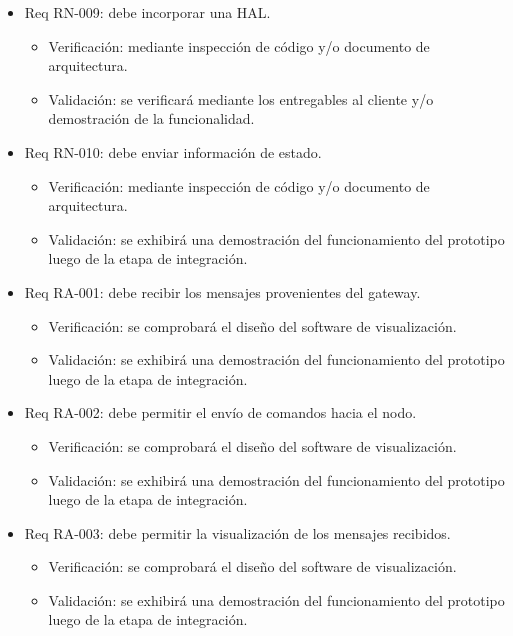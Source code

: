 \documentclass[11pt]{charter}
\begin{document}
\begin{itemize} 
\item Req RN-009: debe incorporar una HAL.
\begin{itemize}
\item Verificación: mediante inspección de código y/o documento de arquitectura.
\item Validación: se verificará mediante los entregables al cliente y/o demostración de la funcionalidad.  
\end{itemize}
\end{itemize}

\begin{itemize} 
\item Req RN-010: debe enviar información de estado.
\begin{itemize}
\item Verificación: mediante inspección de código y/o documento de arquitectura.
\item Validación: se exhibirá una demostración del funcionamiento del prototipo luego de la etapa de integración.  
\end{itemize}
\end{itemize}

\begin{itemize} 
\item Req RA-001: debe recibir los mensajes provenientes del gateway.
\begin{itemize}
\item Verificación: se comprobará el diseño del software de visualización. 
\item Validación: se exhibirá una demostración del funcionamiento del prototipo luego de la etapa de integración.  
\end{itemize}
\end{itemize}

\begin{itemize} 
\item Req RA-002: debe permitir el envío de comandos hacia el nodo.
\begin{itemize}
\item Verificación: se comprobará el diseño del software de visualización. 
\item Validación: se exhibirá una demostración del funcionamiento del prototipo luego de la etapa de integración.  
\end{itemize}
\end{itemize}

\begin{itemize} 
\item Req RA-003: debe permitir la visualización de los mensajes recibidos.
\begin{itemize}
\item Verificación: se comprobará el diseño del software de visualización.
\item Validación: se exhibirá una demostración del funcionamiento del prototipo luego de la etapa de integración.  
\end{itemize}
\end{itemize}
\end{document}
